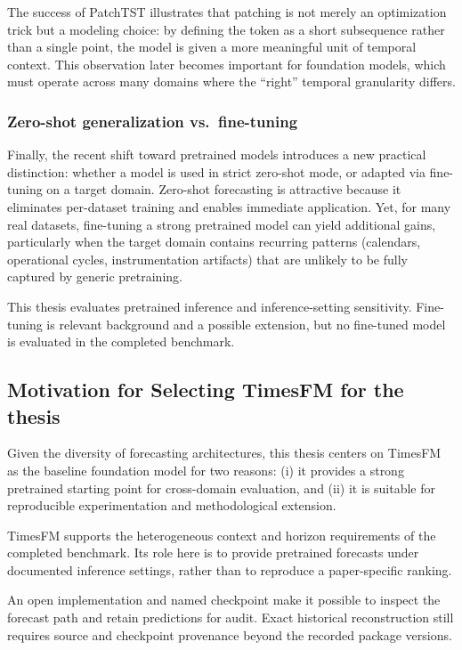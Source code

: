 The success of PatchTST illustrates that patching is not merely an optimization trick but a modeling choice: by defining the token as a short subsequence rather than a single point, the model is given a more meaningful unit of temporal context. This observation later becomes important for foundation models, which must operate across many domains where the ``right'' temporal granularity differs.

\subsubsection{Zero-shot generalization vs.\ fine-tuning}
Finally, the recent shift toward pretrained models introduces a new practical distinction: whether a model is used in strict zero-shot mode, or adapted via fine-tuning on a target domain. Zero-shot forecasting is attractive because it eliminates per-dataset training and enables immediate application. Yet, for many real datasets, fine-tuning a strong pretrained model can yield additional gains, particularly when the target domain contains recurring patterns (calendars, operational cycles, instrumentation artifacts) that are unlikely to be fully captured by generic pretraining.

This thesis evaluates pretrained inference and inference-setting sensitivity. Fine-tuning is relevant background and a possible extension, but no fine-tuned model is evaluated in the completed benchmark.

\subsection{Motivation for Selecting TimesFM for the thesis} 

Given the diversity of forecasting architectures, this thesis centers on TimesFM as the baseline foundation model for two reasons: (i) it provides a strong pretrained starting point for cross-domain evaluation, and (ii) it is suitable for reproducible experimentation and methodological extension.

TimesFM supports the heterogeneous context and horizon requirements of the completed benchmark. Its role here is to provide pretrained forecasts under documented inference settings, rather than to reproduce a paper-specific ranking.

An open implementation and named checkpoint make it possible to inspect the forecast path and retain predictions for audit. Exact historical reconstruction still requires source and checkpoint provenance beyond the recorded package versions.

